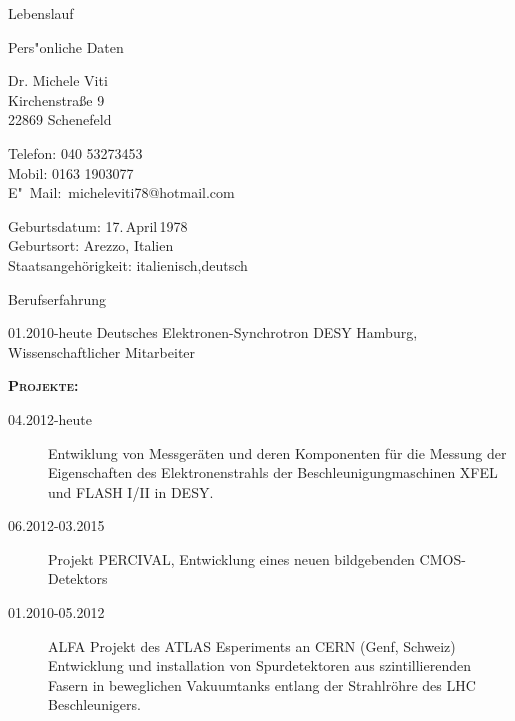\documentclass[11pt,a4paper]{scrartcl}
\begin{document}
\begin{cv}{Lebenslauf}
\begin{cvlist}{Pers"onliche Daten}
\item Dr. Michele Viti\\
Kirchenstra{\ss}e 9\\
22869 Schenefeld
\item Telefon: 040 53273453\\
Mobil: 0163 1903077\\
E"~Mail:~micheleviti78@hotmail.com
\item Geburtsdatum: 17.\,April\,1978\\
Geburtsort: Arezzo, Italien\\
Staatsangeh\"origkeit: italienisch,deutsch
\end{cvlist}

\begin{cvlist}{Berufserfahrung}

\item[01.2010-heute] Deutsches Elektronen-Synchrotron DESY Hamburg,
Wissenschaftlicher Mitarbeiter

{\scshape {\bfseries Projekte:}}
\begin{description}
\item[04.2012-heute]  Entwiklung von Messger{\"a}ten und
deren Komponenten f{\"u}r die Messung der Eigenschaften des Elektronenstrahls
der Beschleunigungmaschinen XFEL und FLASH I/II in DESY.
\item[06.2012-03.2015]Projekt PERCIVAL, Entwicklung eines neuen
bildgebenden CMOS-Detektors
\item[01.2010-05.2012]ALFA Projekt des ATLAS Esperiments an CERN (Genf,
Schweiz) Entwicklung und installation von Spurdetektoren aus szintillierenden
Fasern in beweglichen Vakuumtanks entlang der Strahlr{\"o}hre des LHC
Beschleunigers.
\end{description}


\end{cvlist}
\end{cv}
\end{document}
